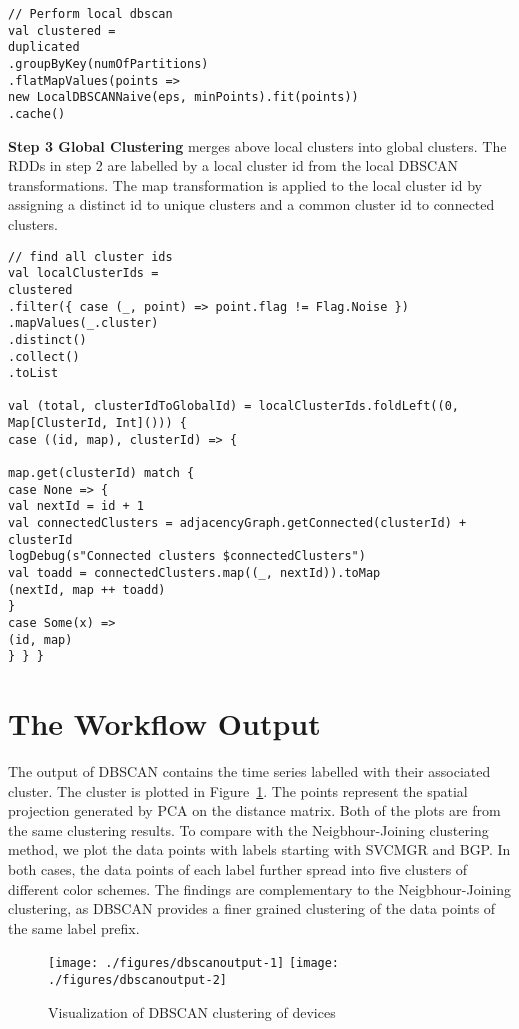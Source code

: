 \begin{lstlisting}[style=myScalastyle,caption={Local DBSCAN},captionpos=b]
// Perform local dbscan
val clustered =
duplicated
.groupByKey(numOfPartitions)
.flatMapValues(points =>
new LocalDBSCANNaive(eps, minPoints).fit(points))
.cache()
\end{lstlisting}



\textbf{Step 3 Global Clustering} merges above local clusters into global clusters. The RDDs in step 2 are labelled by a local cluster \textsf{id} from the local DBSCAN  transformations. The \textsf{map} transformation is applied to the local cluster \textsf{id} by assigning a distinct \textsf{id} to unique clusters and a common cluster \textsf{id} to connected clusters. 

\begin{lstlisting}[style=myScalastyle,caption={Global Clusters generation source code snippet},captionpos=b]	
// find all cluster ids
val localClusterIds =
clustered
.filter({ case (_, point) => point.flag != Flag.Noise })
.mapValues(_.cluster)
.distinct()
.collect()
.toList

val (total, clusterIdToGlobalId) = localClusterIds.foldLeft((0, Map[ClusterId, Int]())) {
case ((id, map), clusterId) => {

map.get(clusterId) match {
case None => {
val nextId = id + 1
val connectedClusters = adjacencyGraph.getConnected(clusterId) + clusterId
logDebug(s"Connected clusters $connectedClusters")
val toadd = connectedClusters.map((_, nextId)).toMap
(nextId, map ++ toadd)
}
case Some(x) =>
(id, map)
} } }
\end{lstlisting}



\section{The Workflow Output}

The output of DBSCAN contains the time series labelled with their associated cluster. The cluster is plotted in Figure~\ref{Fig:dbscan-vis}. The points represent the spatial projection generated by PCA on the distance matrix. Both of the plots are from the same clustering results. To compare with the Neigbhour-Joining clustering method, we plot the data points with labels starting with \textsf{SVCMGR} and \textsf{BGP}. In both cases, the data points of each label further spread into five clusters of different color schemes. 
The findings are complementary to the Neigbhour-Joining clustering, as DBSCAN provides a finer grained clustering of the data points of the same label prefix.  


\begin{figure}
	\texttt{[image: ./figures/dbscanoutput-1]}
	\texttt{[image: ./figures/dbscanoutput-2]}
	\caption{Visualization of DBSCAN clustering of devices}
	\label{Fig:dbscan-vis}
\end{figure}

